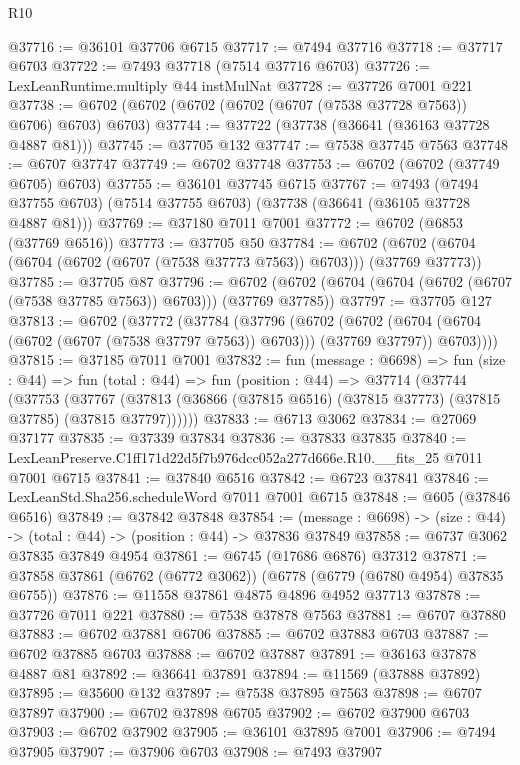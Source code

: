 \begin{lexlean}{R10}
\begin{coremodule}
@37716 := @36101 @37706 @6715
@37717 := @7494 @37716
@37718 := @37717 @6703
@37722 := @7493 @37718 (@7514 @37716 @6703)
@37726 := LexLeanRuntime.multiply @44 instMulNat
@37728 := @37726 @7001 @221
@37738 := @6702 (@6702 (@6702 (@6702 (@6707 (@7538 @37728 @7563)) @6706) @6703) @6703)
@37744 := @37722 (@37738 (@36641 (@36163 @37728 @4887 @81)))
@37745 := @37705 @132
@37747 := @7538 @37745 @7563
@37748 := @6707 @37747
@37749 := @6702 @37748
@37753 := @6702 (@6702 (@37749 @6705) @6703)
@37755 := @36101 @37745 @6715
@37767 := @7493
    (@7494 @37755 @6703)
    (@7514 @37755 @6703)
    (@37738 (@36641 (@36105 @37728 @4887 @81)))
@37769 := @37180 @7011 @7001
@37772 := @6702 (@6853 (@37769 @6516))
@37773 := @37705 @50
@37784 := @6702 (@6702 (@6704 (@6704 (@6702 (@6707 (@7538 @37773 @7563)) @6703))) (@37769 @37773))
@37785 := @37705 @87
@37796 := @6702 (@6702 (@6704 (@6704 (@6702 (@6707 (@7538 @37785 @7563)) @6703))) (@37769 @37785))
@37797 := @37705 @127
@37813 := @6702
    (@37772
      (@37784
        (@37796
          (@6702
            (@6702 (@6704 (@6704 (@6702 (@6707 (@7538 @37797 @7563)) @6703))) (@37769 @37797))
            @6703))))
@37815 := @37185 @7011 @7001
@37832 := fun (message : @6698) =>
  fun (size : @44) =>
  fun (total : @44) =>
  fun (position : @44) =>
  @37714
    (@37744
      (@37753
        (@37767 (@37813 (@36866 (@37815 @6516) (@37815 @37773) (@37815 @37785) (@37815 @37797))))))
@37833 := @6713 @3062
@37834 := @27069 @37177
@37835 := @37339 @37834
@37836 := @37833 @37835
@37840 := LexLeanPreserve.C1ff171d22d5f7b976dcc052a277d666e.R10.__fits_25 @7011 @7001 @6715
@37841 := @37840 @6516
@37842 := @6723 @37841
@37846 := LexLeanStd.Sha256.scheduleWord @7011 @7001 @6715
@37848 := @605 (@37846 @6516)
@37849 := @37842 @37848
@37854 := (message : @6698) -> (size : @44) -> (total : @44) -> (position : @44) -> @37836 @37849
@37858 := @6737 @3062 @37835 @37849 @4954
@37861 := @6745 (@17686 @6876) @37312
@37871 := @37858 @37861 (@6762 (@6772 @3062)) (@6778 (@6779 (@6780 @4954) @37835 @6755))
@37876 := @11558 @37861 @4875 @4896 @4952 @37713
@37878 := @37726 @7011 @221
@37880 := @7538 @37878 @7563
@37881 := @6707 @37880
@37883 := @6702 @37881 @6706
@37885 := @6702 @37883 @6703
@37887 := @6702 @37885 @6703
@37888 := @6702 @37887
@37891 := @36163 @37878 @4887 @81
@37892 := @36641 @37891
@37894 := @11569 (@37888 @37892)
@37895 := @35600 @132
@37897 := @7538 @37895 @7563
@37898 := @6707 @37897
@37900 := @6702 @37898 @6705
@37902 := @6702 @37900 @6703
@37903 := @6702 @37902
@37905 := @36101 @37895 @7001
@37906 := @7494 @37905
@37907 := @37906 @6703
@37908 := @7493 @37907

\end{coremodule}
\end{lexlean}
